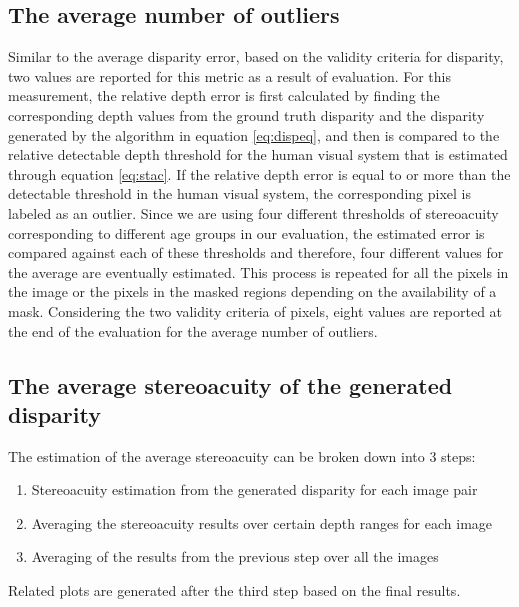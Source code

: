\subsection{The average number of outliers}
Similar to the average disparity error, based on the validity criteria for disparity, 
two values are reported for this metric as a result of evaluation. For this measurement, the relative depth error is first calculated by finding the corresponding depth values
from the ground truth disparity and the disparity generated by the algorithm in equation \ref{eq:dispeq}, and then is compared to the relative 
detectable depth threshold for the human visual system that is estimated through
equation \ref{eq:stac}. If the relative depth error is equal to or more than the detectable threshold in the human visual system,
the corresponding pixel is labeled as an outlier. Since we are using four different thresholds of stereoacuity corresponding to different
age groups in our evaluation, the estimated error is compared against each of these thresholds and therefore,
four different values for the average are eventually estimated. This process is repeated for all the pixels in the image or 
the pixels in the masked regions depending on the availability of a mask.
Considering the two validity criteria of pixels, eight values are reported at the end of the evaluation for the average number of outliers.

\subsection{The average stereoacuity of the generated disparity}
The estimation of the average stereoacuity can be broken down into 3 steps:

\begin{enumerate}
\item Stereoacuity estimation from the generated disparity for each image pair
\item Averaging the stereoacuity results over certain depth ranges for each image
\item Averaging of the results from the previous step over all the images
\end{enumerate}
Related plots are generated after the third step based on the final results.

